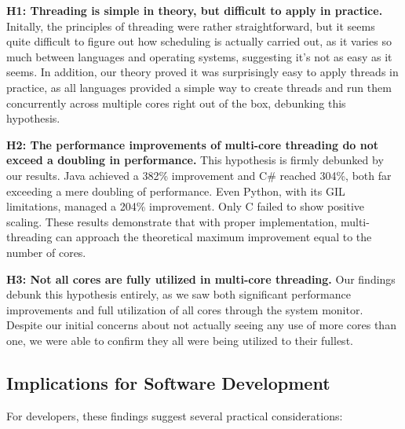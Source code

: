 \documentclass[12pt,a4paper]{article}
\begin{document}
\textbf{H1: Threading is simple in theory, but difficult to apply in practice.}
Initally, the principles of threading were rather straightforward, but it seems quite difficult to figure out how scheduling is actually carried out, as it varies so much between languages and operating systems, suggesting it's not as easy as it seems. In addition, our theory proved it was surprisingly easy to apply threads in practice, as all languages provided a simple way to create threads and run them concurrently across multiple cores right out of the box, debunking this hypothesis. 

\textbf{H2: The performance improvements of multi-core threading do not exceed a doubling in performance.}
This hypothesis is firmly debunked by our results. Java achieved a 382\% improvement and C\# reached 304\%, both far exceeding a mere doubling of performance. Even Python, with its GIL limitations, managed a 204\% improvement. Only C failed to show positive scaling. These results demonstrate that with proper implementation, multi-threading can approach the theoretical maximum improvement equal to the number of cores.

\textbf{H3: Not all cores are fully utilized in multi-core threading.}
Our findings debunk this hypothesis entirely, as we saw both significant performance improvements and full utilization of all cores through the system monitor. Despite our initial concerns about not actually seeing any use of more cores than one, we were able to confirm they all were being utilized to their fullest.

\subsection{Implications for Software Development}

For developers, these findings suggest several practical considerations:
\end{document}
